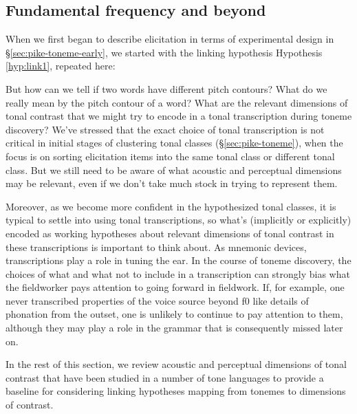 \documentclass[12pt]{article}
\begin{document}
\subsection{Fundamental frequency and beyond}
\label{sec:beyond-f0}

When we first began to describe elicitation in terms of experimental
design in \S\ref{sec:pike-toneme-early}, we started with the linking
hypothesis Hypothesis \ref{hyp:link1}, repeated here: 

\link*

But how can we tell if two words have different pitch contours?  What
do we really mean by the pitch contour of a word? What are the
relevant dimensions of tonal contrast that we might try to encode in
a tonal transcription during toneme discovery? We've stressed that the
exact choice of tonal transcription is not critical in initial stages
of clustering tonal classes (\S\ref{sec:pike-toneme}), when the focus
is on sorting elicitation items into the same tonal class or different
tonal class. But we still need to be aware of what acoustic and
perceptual dimensions may be relevant, even if we don't take much
stock in trying to represent them. 

Moreover, as we become more confident in the hypothesized tonal
classes, it is typical to settle into using tonal transcriptions, so what's
(implicitly or explicitly) encoded as working hypotheses about
relevant dimensions of tonal contrast in these transcriptions is
important to think about. As mnemonic devices, transcriptions play a
role in tuning the ear. In the course of toneme discovery, the choices of
what and what not to include in a transcription can strongly bias what
the fieldworker pays attention to going forward in fieldwork. If, for
example, one never transcribed properties of the voice source beyond
f0 like details of phonation from the outset, one is unlikely to
continue to pay attention to them, although they may play a role in
the grammar that is consequently missed later on. 

In the rest of this section, we review acoustic and perceptual
dimensions of tonal contrast that have been studied in a number of
tone languages to provide a baseline for considering linking
hypotheses mapping from tonemes to dimensions of contrast. 
\end{document}
